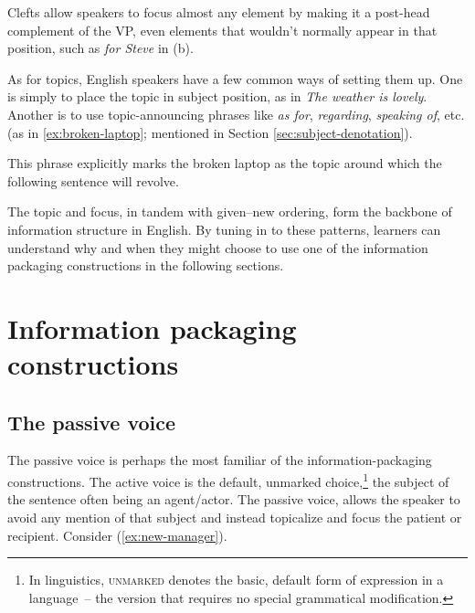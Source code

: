 \ea\label{ex:laptop-cleft}
    \z
\z

Clefts allow speakers to focus almost any element by making it a post-head complement of the VP, even elements that wouldn't normally appear in that position, such as \textit{for Steve} in (b).

As for topics, English speakers have a few common ways of setting them up. One is simply to place the topic in subject position, as in \textit{The weather is lovely}. Another is to use topic-announcing phrases like \textit{as for}, \textit{regarding}, \textit{speaking of}, etc. (as in \ref{ex:broken-laptop}; mentioned in Section \ref{sec:subject-denotation}).

\label{ex:broken-laptop}
\z

This phrase explicitly marks the broken laptop as the topic around which the following sentence will revolve.

The topic and focus, in tandem with given--new ordering, form the backbone of information structure in English. By tuning in to these patterns, learners can understand why and when they might choose to use one of the information packaging constructions in the following sections.

\section{Information packaging constructions}

\subsection{The passive voice} \label{sec:passive}

The passive voice is perhaps the most familiar of the information-packaging constructions. The active voice is the default, unmarked choice,\footnote{In linguistics, \textsc{unmarked} denotes the basic, default form of expression in a language~-- the version that requires no special grammatical modification.} the subject of the sentence often being an agent/actor. The passive voice, allows the speaker to avoid any mention of that subject and instead topicalize and focus the patient or recipient.  Consider (\ref{ex:new-manager}).

